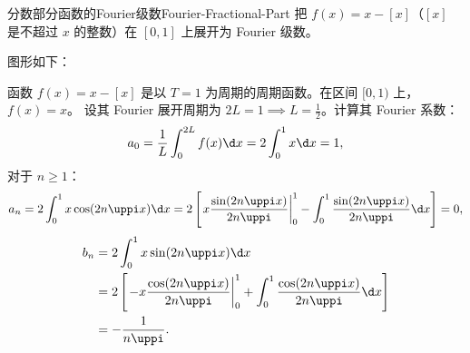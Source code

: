 \begin{problem}{分数部分函数的Fourier级数}{Fourier-Fractional-Part}
    把 $f(x) = x - [x]$（$[x]$ 是不超过 $x$ 的整数）在 $[0, 1]$ 上展开为 Fourier 级数。
\end{problem}

\begin{solution}
    图形如下：
    \begin{center}
    \end{center}

    函数 $f(x) = x - [x]$ 是以 $T = 1$ 为周期的周期函数。在区间 $[0, 1)$ 上，$f(x) = x$。
    设其 Fourier 展开周期为 $2L = 1 \implies L = \frac{1}{2}$。计算其 Fourier 系数：
    \begin{equation}\label{eq:frac-a0}
        a_0 = \frac{1}{L} \int_{0}^{2L} f(x) \d x = 2 \int_{0}^{1} x \d x = 1,
    \end{equation}
    对于 $n \geqslant 1$：
    \begin{equation}\label{eq:frac-an}
        a_n = 2 \int_{0}^{1} x \cos(2n\uppi x) \d x = 2 \left[ \left. x \frac{\sin(2n\uppi x)}{2n\uppi} \right|_{0}^{1} - \int_{0}^{1} \frac{\sin(2n\uppi x)}{2n\uppi} \d x \right] = 0,
    \end{equation}
    \begin{equation}\label{eq:frac-bn}
        \begin{aligned}
            b_n & = 2 \int_{0}^{1} x \sin(2n\uppi x) \d x                                                                                          \\
                & = 2 \left[ \left. -x \frac{\cos(2n\uppi x)}{2n\uppi} \right|_{0}^{1} + \int_{0}^{1} \frac{\cos(2n\uppi x)}{2n\uppi} \d x \right] \\
                & = -\frac{1}{n\uppi}.
        \end{aligned}
    \end{equation}


\end{solution}
